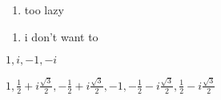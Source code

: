 \begin{Solution}{9}
	\begin{enumerate}[label = (\alph*)]
		\item too lazy		
	\end{enumerate}
\end{Solution}
\begin{Solution}{10}
	\begin{multicols}{2}
	\begin{enumerate}[label = (\alph*)]
		\item i don't want to
	\end{enumerate}
	\end{multicols}
\end{Solution}
\begin{Solution}{11}
	\(\boxed{1,i,-1,-i}\)	
\end{Solution}
\begin{Solution}{12}
	\(\boxed{1, \frac{1}{2}+i\frac{\sqrt{3}}{2}, -\frac{1}{2}+i\frac{\sqrt{3}}{2},-1,-\frac{1}{2}-i\frac{\sqrt{3}}{2},\frac{1}{2}-i\frac{\sqrt{3}}{2}}\)
\end{Solution}
